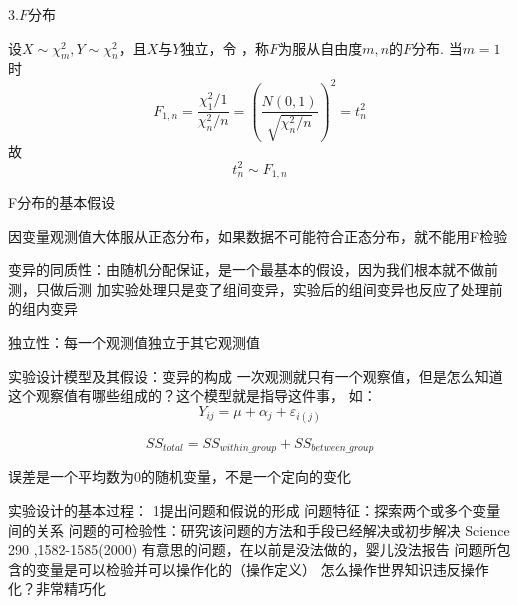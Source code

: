 3.$F$分布

设$X\sim \chi _{m}^{2},Y\sim \chi _{n}^{2}$，且$X$与$Y$独立，令 ，称$F$为服从自由度$m,n$的$F$分布.
当$m=1$时
$$
F_{1,n}=\frac{\chi _{1}^{2}/1}{\chi _{n}^{2}/n}=\left( \frac{N\left( 0,1 \right)}{\sqrt{\chi _{n}^{2}/n}} \right) ^2=t_{n}^{2}
$$
故
$$
t_{n}^{2}\sim F_{1,n}
$$

F分布的基本假设

因变量观测值大体服从正态分布，如果数据不可能符合正态分布，就不能用F检验
 
变异的同质性：由随机分配保证，是一个最基本的假设，因为我们根本就不做前测，只做后测
	加实验处理只是变了组间变异，实验后的组间变异也反应了处理前的组内变异
 
 独立性：每一个观测值独立于其它观测值 


实验设计模型及其假设：变异的构成
一次观测就只有一个观察值，但是怎么知道这个观察值有哪些组成的？这个模型就是指导这件事，
如：
$$
Y_{ij}=\mu +\alpha_j + \varepsilon_{i(j)}
$$

$$
SS_{total}=SS_{within\_group}+SS_{between\_group}
$$



误差是一个平均数为0的随机变量，不是一个定向的变化


实验设计的基本过程：
1提出问题和假说的形成
问题特征：探索两个或多个变量间的关系
问题的可检验性：研究该问题的方法和手段已经解决或初步解决
Science 290 ,1582-1585(2000) 有意思的问题，在以前是没法做的，婴儿没法报告
问题所包含的变量是可以检验并可以操作化的（操作定义）
怎么操作世界知识违反操作化？非常精巧化